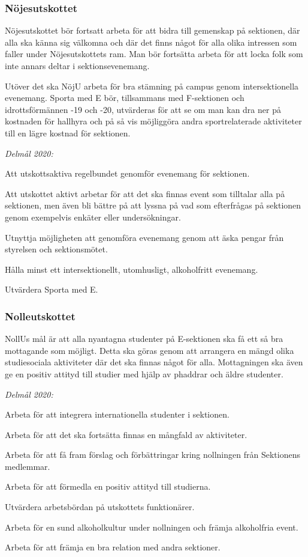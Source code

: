 \documentclass[../_main/handlingar.tex]{subfiles}
\begin{document}
\subsubsection*{Nöjesutskottet}
Nöjesutskottet bör fortsatt arbeta för att bidra till gemenskap på sektionen, där alla ska känna sig välkomna och där det finns något för alla olika intressen som faller under Nöjesutskottets ram. Man bör fortsätta arbeta för att locka folk som inte annars deltar i sektionsevenemang. 

Utöver det ska NöjU arbeta för bra stämning på campus genom intersektionella evenemang. Sporta med E bör, tillsammans med F-sektionen och idrottsförmännen -19 och -20, utvärderas för att se om man kan dra ner på kostnaden för hallhyra och på så vis möjliggöra andra sportrelaterade aktiviteter till en lägre kostnad för sektionen.  


\emph{Delmål 2020:}
\begin{dashlist}
	\item Att utskottsaktiva regelbundet genomför evenemang för sektionen.
	\item Att utskottet aktivt arbetar för att det ska finnas event som tilltalar alla på sektionen, men även bli bättre på att lyssna på vad som efterfrågas på sektionen genom exempelvis enkäter eller undersökningar.
	\item Utnyttja möjligheten att genomföra evenemang genom att äska pengar från styrelsen och sektionsmötet.
	\item Hålla minst ett intersektionellt, utomhusligt, alkoholfritt evenemang.
	\item Utvärdera Sporta med E.
\end{dashlist}

\subsubsection*{Nolleutskottet}
NollUs mål är att alla nyantagna studenter på E-sektionen ska få ett så bra mottagande som möjligt. Detta ska göras genom att arrangera en mängd olika studiesociala aktiviteter där det ska finnas något för alla. Mottagningen ska även ge en positiv attityd till studier med hjälp av phaddrar och äldre studenter. 

\emph{Delmål 2020:}
\begin{dashlist}
	\item Arbeta för att integrera internationella studenter i sektionen. 
	\item Arbeta för att det ska fortsätta finnas en mångfald av aktiviteter.
	\item Arbeta för att få fram förslag och förbättringar kring nollningen från Sektionens medlemmar.
	\item Arbeta för att förmedla en positiv attityd till studierna.
	\item Utvärdera arbetsbördan på utskottets funktionärer.
	\item Arbeta för en sund alkoholkultur under nollningen och främja alkoholfria event.
	\item Arbeta för att främja en bra relation med andra sektioner.
\end{dashlist}
\end{document}

